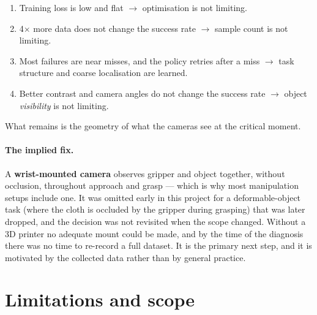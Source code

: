 \documentclass[11pt,a4paper]{article}
\begin{document}
\begin{enumerate}
  \item Training loss is low and flat $\rightarrow$ optimisation is not limiting.
  \item 4$\times$ more data does not change the success rate $\rightarrow$
        sample count is not limiting.
  \item Most failures are near misses, and the policy retries after a miss
        $\rightarrow$ task structure and coarse localisation are learned.
  \item Better contrast and camera angles do not change the success rate
        $\rightarrow$ object \emph{visibility} is not limiting.
\end{enumerate}
What remains is the geometry of what the cameras see at the critical moment.

\paragraph{The implied fix.} A \textbf{wrist-mounted camera} observes gripper
and object together, without occlusion, throughout approach and grasp --- which
is why most manipulation setups include one. It was omitted early in this
project for a deformable-object task (where the cloth is occluded by the
gripper during grasping) that was later dropped, and the decision was not
revisited when the scope changed. Without a 3D printer no adequate mount could
be made, and by the time of the diagnosis there was no time to re-record a full
dataset. It is the primary next step, and it is motivated by the collected data
rather than by general practice.

\section{Limitations and scope}
\label{sec:scope}
\end{document}
